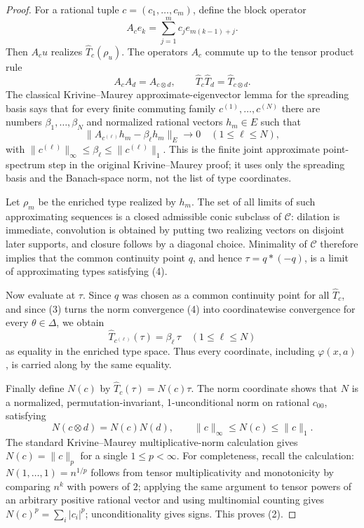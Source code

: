 \documentclass[11pt]{article}
\newcommand{\C}{\mathcal{C}}
\begin{document}
\begin{proof}
For a rational tuple \(c=(c_1,\ldots,c_m)\), define the block operator
\[
  A_c e_k=\sum_{j=1}^m c_j e_{m(k-1)+j}.
\]
Then \(A_c u\) realizes \(\widehat T_c(\rho_u)\). The operators \(A_c\)
commute up to the tensor product rule
\[
  A_cA_d=A_{c\otimes d},
  \qquad
  \widehat T_c\widehat T_d=\widehat T_{c\otimes d}.
\]
The classical Krivine--Maurey approximate-eigenvector lemma for the
spreading basis says that for every finite commuting family
\(c^{(1)},\ldots,c^{(N)}\) there are numbers
\(\beta_1,\ldots,\beta_N\) and normalized rational vectors \(h_m\in E\) such
that
\[
  \|A_{c^{(\ell)}}h_m-\beta_\ell h_m\|_E\longrightarrow0
  \quad(1\le \ell\le N),
  \tag{4}
\]
with \(\|c^{(\ell)}\|_\infty\le\beta_\ell\le\|c^{(\ell)}\|_1\).
This is the finite joint approximate point-spectrum step in the original
Krivine--Maurey proof; it uses only the spreading basis and the Banach-space
norm, not the list of type coordinates.

Let \(\rho_m\) be the enriched type realized by \(h_m\). The set of all
limits of such approximating sequences is a closed admissible conic subclass
of \(\C\): dilation is immediate, convolution is obtained by putting two
realizing vectors on disjoint later supports, and closure follows by a
diagonal choice. Minimality of \(\C\) therefore implies that the common
continuity point \(q\), and hence \(\tau=q*(-q)\), is a limit of
approximating types satisfying (4).

Now evaluate at \(\tau\). Since \(q\) was chosen as a common continuity point
for all \(\widehat T_c\), and since (3) turns the norm convergence (4) into
coordinatewise convergence for every \(\theta\in\Delta\), we obtain
\[
  \widehat T_{c^{(\ell)}}(\tau)=\beta_\ell\,\tau
  \quad(1\le \ell\le N)
  \tag{5}
\]
as equality in the enriched type space. Thus every coordinate, including
\(\varphi(x,a)\), is carried along by the same equality.

Finally define \(N(c)\) by \(\widehat T_c(\tau)=N(c)\tau\). The norm
coordinate shows that \(N\) is a normalized, permutation-invariant,
1-unconditional norm on rational \(c_{00}\), satisfying
\[
  N(c\otimes d)=N(c)N(d),
  \qquad
  \|c\|_\infty\le N(c)\le\|c\|_1.
\]
The standard Krivine--Maurey multiplicative-norm calculation gives
\(N(c)=\|c\|_p\) for a single \(1\le p<\infty\). For completeness, recall
the calculation: \(N(1,\ldots,1)=n^{1/p}\) follows from tensor
multiplicativity and monotonicity by comparing \(n^k\) with powers of \(2\);
applying the same argument to tensor powers of an arbitrary positive rational
vector and using multinomial counting gives
\(N(c)^p=\sum_i |c_i|^p\); unconditionality gives signs. This proves (2).
\end{proof}
\end{document}
